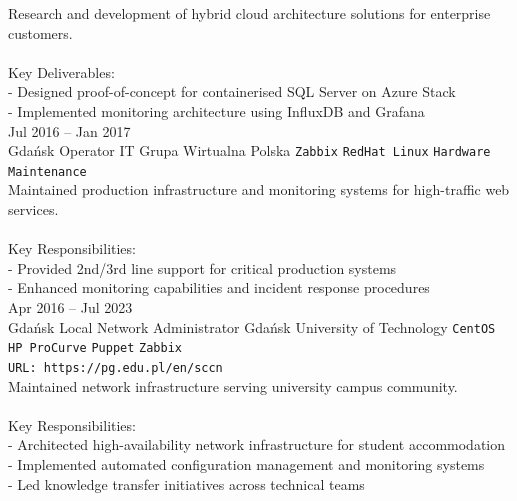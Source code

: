 \documentclass[9pt]{style/developercv}
\begin{document}
\begin{entrylist}
{      Research and development of hybrid cloud architecture solutions for enterprise customers.\\
      \\
      Key Deliverables:\\
      - Designed proof-of-concept for containerised SQL Server on Azure Stack\\
      - Implemented monitoring architecture using InfluxDB and Grafana\\

		}
	\entry
    {Jul 2016 -- Jan 2017\\\footnotesize{Gdańsk}}
		{Operator IT}
		{Grupa Wirtualna Polska}
		{
			\texttt{Zabbix}\slashsep
			\texttt{RedHat Linux}\slashsep
			\texttt{Hardware Maintenance}\\

      Maintained production infrastructure and monitoring systems for high-traffic web services.\\
      \\
      Key Responsibilities:\\
      - Provided 2nd/3rd line support for critical production systems\\
      - Enhanced monitoring capabilities and incident response procedures\\
		}
	\entry
    {Apr 2016 -- Jul 2023\\\footnotesize{Gdańsk}}
    {Local Network Administrator}
    {Gdańsk University of Technology}
		{
			\texttt{CentOS}\slashsep
			\texttt{HP ProCurve}\slashsep
			\texttt{Puppet}\slashsep
			\texttt{Zabbix}\\
      \texttt{URL: https://pg.edu.pl/en/sccn}\\

      Maintained network infrastructure serving university campus community.\\
      \\
      Key Responsibilities:\\
      - Architected high-availability network infrastructure for student accommodation\\
      - Implemented automated configuration management and monitoring systems\\
      - Led knowledge transfer initiatives across technical teams\\
		}
\end{entrylist}

\end{document}
